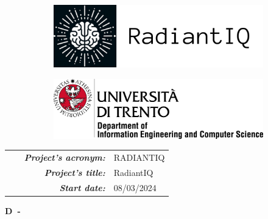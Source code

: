 \thispagestyle{empty}

\begin{center}

\begin{figure}
\centering
  \begin{subfigure}[b]{0.4\textwidth}
    \includegraphics[width=0.7\linewidth]{images/radiantiq}
  \end{subfigure}
 \hfill
  \begin{subfigure}[b]{0.4\textwidth}
    \includegraphics[width=0.8\linewidth]{images/unitn}
  \end{subfigure}
\end{figure}

\vspace{1.5cm}



{\setlength{\extrarowheight}{2pt}
\begin{tabular}{|rp{10cm}|}
\hline
\textcolor{RFIGreen}{\small\bf\em ~~~Project's acronym:} & {\small RADIANTIQ}\\

\textcolor{RFIGreen}{\small\bf\em Project's title:} & {\small RadiantIQ}\\

\textcolor{RFIGreen}{\small\bf\em Start date:} & {\small 08/03/2024}\\
\hline
\end{tabular}
}
\vspace{2cm}

{\huge\bf D\theDeliverableNumber\ - \theDeliverableTitle}

\vspace{2cm}


\end{center}
